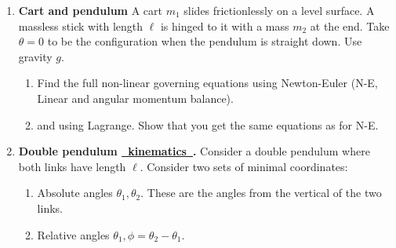 \documentclass[11pt]{article}
\def\tight{ \setlength{\itemsep}{1.5pt}\setlength{\parskip}{0pt}\setlength{\parsep}{0pt}}
\begin{document}
\begin{enumerate}
\begin{enumerate}
\item Find the equations of motion using Lagrange equations, and check for agreement.

\item Assume ICs that  $s(0)=0, \dot s(0) = v_0,  \theta(0)=0$ and $\dot\theta(0)=\omega_0>0$.
As $t\rightarrow\infty$ does $\theta\rightarrow\infty$? (As for all questions, please explain in a way that would convince a non-believer.)


\end{enumerate}


\item{\bf Cart and pendulum}\label{HWcartpendulum}
A cart $m_1$ slides frictionlessly on a level surface.  A massless stick  with length $\ell$ is
hinged to it with a mass $m_2$ at the end.  Take $\theta=0$ to be the configuration when
the pendulum is straight down.  Use gravity $g$.    

\begin{enumerate}\tight

\item Find the full non-linear governing equations using Newton-Euler  (N-E, Linear and angular momentum
balance).

\item and using Lagrange. Show that you get the same equations as for N-E.

%

\end{enumerate}




\item{\bf Double pendulum \underline{\large \ kinematics\ }.}\label{doublependkin}
Consider a double pendulum where both links have length $\ell$. 
Consider two sets of minimal coordinates:

\begin{enumerate}
\item  Absolute angles $\theta_1,\theta_2$.  These are the angles from the vertical of the
two links.

\item Relative angles $\theta_1, \phi=\theta_2 -\theta_1$.
\end{enumerate}


\end{enumerate}
\end{document}
